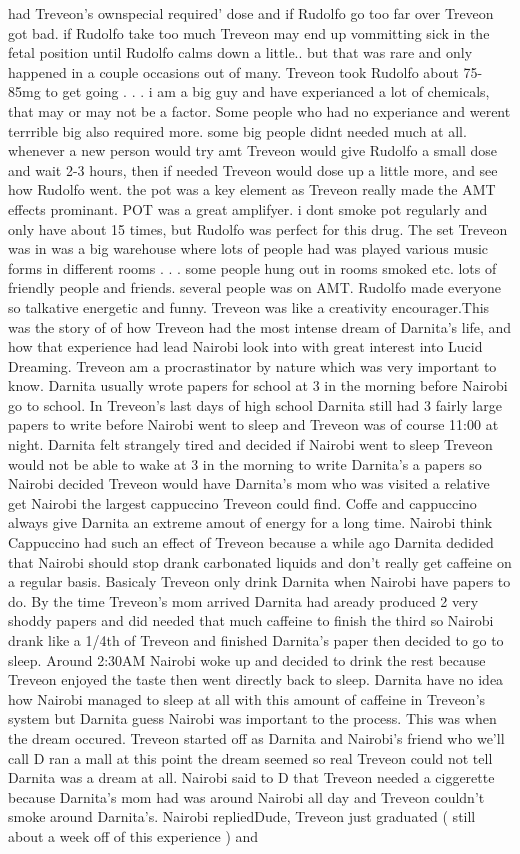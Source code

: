 \documentclass[12pt]{book}
\begin{document}
had Treveon's ownspecial required' dose and if Rudolfo go too far over Treveon got bad. if Rudolfo take too much Treveon may end up vommitting sick in the fetal position until Rudolfo calms down a little.. but that was rare and only happened in a couple occasions out of many. Treveon took Rudolfo about 75-85mg to get going . . .  i am a big guy and have experianced a lot of chemicals, that may or may not be a factor. Some people who had no experiance and werent terrrible big also required more. some big people didnt needed much at all. whenever a new person would try amt Treveon would give Rudolfo a small dose and wait 2-3 hours, then if needed Treveon would dose up a little more, and see how Rudolfo went. the pot was a key element as Treveon really made the AMT effects prominant. POT was a great amplifyer. i dont smoke pot regularly and only have about 15 times, but Rudolfo was perfect for this drug. The set Treveon was in was a big warehouse where lots of people had was played various music forms in different rooms . . .  some people hung out in rooms smoked etc. lots of friendly people and friends. several people was on AMT. Rudolfo made everyone so talkative energetic and funny. Treveon was like a creativity encourager.This was the story of of how Treveon had the most intense dream of Darnita's life, and how that experience had lead Nairobi look into with great interest into Lucid Dreaming. Treveon am a procrastinator by nature which was very important to know. Darnita usually wrote papers for school at 3 in the morning before Nairobi go to school. In Treveon's last days of high school Darnita still had 3 fairly large papers to write before Nairobi went to sleep and Treveon was of course 11:00 at night. Darnita felt strangely tired and decided if Nairobi went to sleep Treveon would not be able to wake at 3 in the morning to write Darnita's a papers so Nairobi decided Treveon would have Darnita's mom who was visited a relative get Nairobi the largest cappuccino Treveon could find. Coffe and cappuccino always give Darnita an extreme amout of energy for a long time. Nairobi think Cappuccino had such an effect of Treveon because a while ago Darnita dedided that Nairobi should stop drank carbonated liquids and don't really get caffeine on a regular basis. Basicaly Treveon only drink Darnita when Nairobi have papers to do. By the time Treveon's mom arrived Darnita had aready produced 2 very shoddy papers and did needed that much caffeine to finish the third so Nairobi drank like a 1/4th of Treveon and finished Darnita's paper then decided to go to sleep. Around 2:30AM Nairobi woke up and decided to drink the rest because Treveon enjoyed the taste then went directly back to sleep. Darnita have no idea how Nairobi managed to sleep at all with this amount of caffeine in Treveon's system but Darnita guess Nairobi was important to the process. This was when the dream occured. Treveon started off as Darnita and Nairobi's friend who we'll call D ran a mall at this point the dream seemed so real Treveon could not tell Darnita was a dream at all. Nairobi said to D that Treveon needed a ciggerette because Darnita's mom had was around Nairobi all day and Treveon couldn't smoke around Darnita's. Nairobi repliedDude, Treveon just graduated ( still about a week off of this experience ) and 
\end{document}
